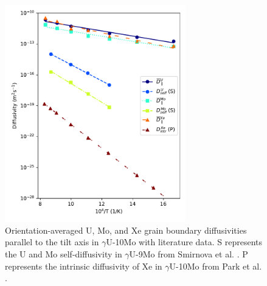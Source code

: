 \documentclass{elsarticle}
\providecommand{\DIFadd}[1]{{\protect\color{blue} \sf #1}} %
\providecommand{\DIFaddbegin}{} %
\providecommand{\DIFaddFL}[1]{\DIFadd{#1}} %
\begin{document}
\DIFaddbegin \begin{figure}[!ht]
\centering
\includegraphics[width=0.70\textwidth]{newLitComp.pdf}
\caption{\DIFaddFL{Orientation-averaged U, Mo, and Xe grain boundary diffusivities parallel to the tilt axis in $\gamma$U-10Mo with literature data. S represents the U and Mo self-diffusivity in $\gamma$U-9Mo from Smirnova et al. \cite{smirnova2015}. P represents the intrinsic diffusivity of Xe in $\gamma$U-10Mo from Park et al. \cite{park2023}.}}
\label{fig:umoxe}
\end{figure}
\end{document}
